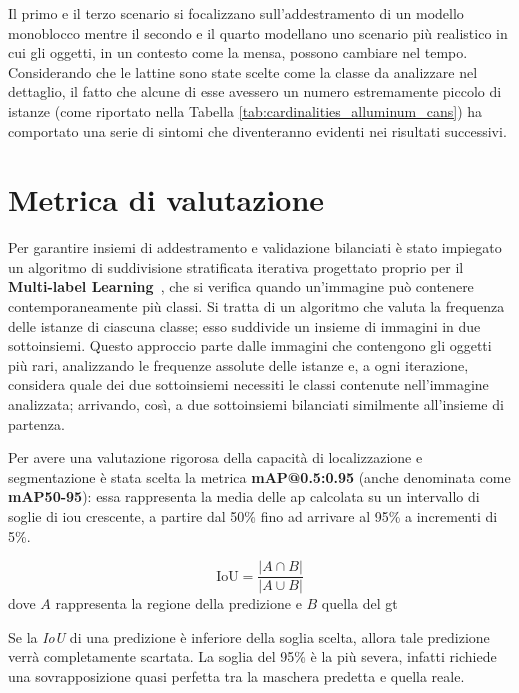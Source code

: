 \documentclass[../main.tex]{subfiles}
\begin{document}
\noindent
Il primo e il terzo scenario si focalizzano sull'addestramento di un modello monoblocco mentre il secondo e il quarto modellano uno scenario più realistico in cui gli oggetti, in un contesto come la mensa, possono cambiare nel tempo. Considerando che le lattine sono state scelte come la classe da analizzare nel dettaglio, il fatto che alcune di esse avessero un numero estremamente piccolo di istanze (come riportato nella Tabella \ref{tab:cardinalities_alluminum_cans}) ha comportato una serie di sintomi che diventeranno evidenti nei risultati successivi.

\clearpage

\section{Metrica di valutazione}
Per garantire insiemi di addestramento e validazione bilanciati è stato impiegato un algoritmo di suddivisione stratificata iterativa progettato proprio per il \textbf{Multi-label Learning}~\cite{scikit_multilearn}, che si verifica quando un'immagine può contenere contemporaneamente più classi. Si tratta di un algoritmo che valuta la frequenza delle istanze di ciascuna classe; esso suddivide un insieme di immagini in due sottoinsiemi. Questo approccio parte dalle immagini che contengono gli oggetti più rari, analizzando le frequenze assolute delle istanze e, a ogni iterazione, considera quale dei due sottoinsiemi necessiti le classi contenute nell'immagine analizzata; arrivando, così, a due sottoinsiemi bilanciati similmente all'insieme di partenza.

\vspace{\baselineskip}
\noindent
Per avere una valutazione rigorosa della capacità di localizzazione e segmentazione è stata scelta la metrica \textbf{mAP@0.5:0.95} (anche denominata come \textbf{mAP50-95}): essa rappresenta la media delle \gls{ap} calcolata su un intervallo di soglie di \gls{iou} crescente, a partire dal 50\% fino ad arrivare al 95\% a incrementi di 5\%.

\begin{equation}
    \text{IoU} = \frac{\lvert A \cap B \rvert}{\lvert A \cup B \rvert}
\end{equation}
dove $A$ rappresenta la regione della predizione e $B$ quella del \gls{gt}

\vspace{\baselineskip}
\noindent
Se la \textit{IoU} di una predizione è inferiore della soglia scelta, allora tale predizione verrà completamente scartata. La soglia del 95\% è la più severa, infatti richiede una sovrapposizione quasi perfetta tra la maschera predetta e quella reale.
\end{document}
